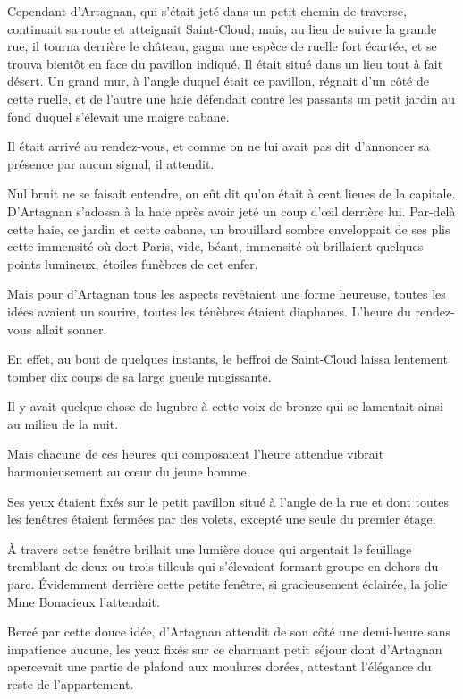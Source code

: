 Cependant d'Artagnan, qui s'était jeté dans un petit chemin de traverse, continuait sa route et atteignait Saint-Cloud; mais, au lieu de suivre la grande rue, il tourna derrière le château, gagna une espèce de ruelle fort écartée, et se trouva bientôt en face du pavillon indiqué. Il était situé dans un lieu tout à fait désert. Un grand mur, à l'angle duquel était ce pavillon, régnait d'un côté de cette ruelle, et de l'autre une haie défendait contre les passants un petit jardin au fond duquel s'élevait une maigre cabane. 

Il était arrivé au rendez-vous, et comme on ne lui avait pas dit d'annoncer sa présence par aucun signal, il attendit. 

Nul bruit ne se faisait entendre, on eût dit qu'on était à cent lieues de la capitale. D'Artagnan s'adossa à la haie après avoir jeté un coup d'œil derrière lui. Par-delà cette haie, ce jardin et cette cabane, un brouillard sombre enveloppait de ses plis cette immensité où dort Paris, vide, béant, immensité où brillaient quelques points lumineux, étoiles funèbres de cet enfer. 

Mais pour d'Artagnan tous les aspects revêtaient une forme heureuse, toutes les idées avaient un sourire, toutes les ténèbres étaient diaphanes. L'heure du rendez-vous allait sonner. 

En effet, au bout de quelques instants, le beffroi de Saint-Cloud laissa lentement tomber dix coups de sa large gueule mugissante. 

Il y avait quelque chose de lugubre à cette voix de bronze qui se lamentait ainsi au milieu de la nuit. 

Mais chacune de ces heures qui composaient l'heure attendue vibrait harmonieusement au cœur du jeune homme. 

Ses yeux étaient fixés sur le petit pavillon situé à l'angle de la rue et dont toutes les fenêtres étaient fermées par des volets, excepté une seule du premier étage. 

À travers cette fenêtre brillait une lumière douce qui argentait le feuillage tremblant de deux ou trois tilleuls qui s'élevaient formant groupe en dehors du parc. Évidemment derrière cette petite fenêtre, si gracieusement éclairée, la jolie Mme Bonacieux l'attendait. 

Bercé par cette douce idée, d'Artagnan attendit de son côté une demi-heure sans impatience aucune, les yeux fixés sur ce charmant petit séjour dont d'Artagnan apercevait une partie de plafond aux moulures dorées, attestant l'élégance du reste de l'appartement. 

